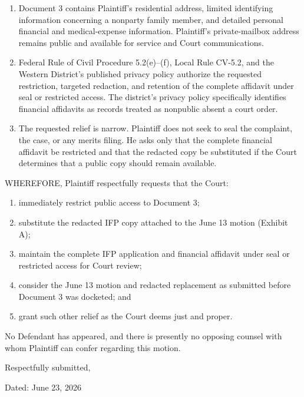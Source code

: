 \documentclass[12pt]{article}
\newcommand{\RenewedMotionDate}{June 23, 2026}
\begin{document}
\begin{enumerate}
\item Document 3 contains Plaintiff's residential address, limited identifying information concerning a nonparty family member, and detailed personal financial and medical-expense information. Plaintiff's private-mailbox address remains public and available for service and Court communications.

\item Federal Rule of Civil Procedure 5.2(e)--(f), Local Rule CV-5.2, and the Western District's published privacy policy authorize the requested restriction, targeted redaction, and retention of the complete affidavit under seal or restricted access. The district's privacy policy specifically identifies financial affidavits as records treated as nonpublic absent a court order.

\item The requested relief is narrow. Plaintiff does not seek to seal the complaint, the case, or any merits filing. He asks only that the complete financial affidavit be restricted and that the redacted copy be substituted if the Court determines that a public copy should remain available.
\end{enumerate}

WHEREFORE, Plaintiff respectfully requests that the Court:

\begin{enumerate}[label=\Alph*.,leftmargin=0.5in]
\item immediately restrict public access to Document 3;
\item substitute the redacted IFP copy attached to the June 13 motion (Exhibit A);
\item maintain the complete IFP application and financial affidavit under seal or restricted access for Court review;
\item consider the June 13 motion and redacted replacement as submitted before Document 3 was docketed; and
\item grant such other relief as the Court deems just and proper.
\end{enumerate}

No Defendant has appeared, and there is presently no opposing counsel with whom Plaintiff can confer regarding this motion.

\singlespacing
\vspace{0.25em}
\noindent Respectfully submitted,

\vspace{0.5em}
\noindent Dated: \RenewedMotionDate
\end{document}
